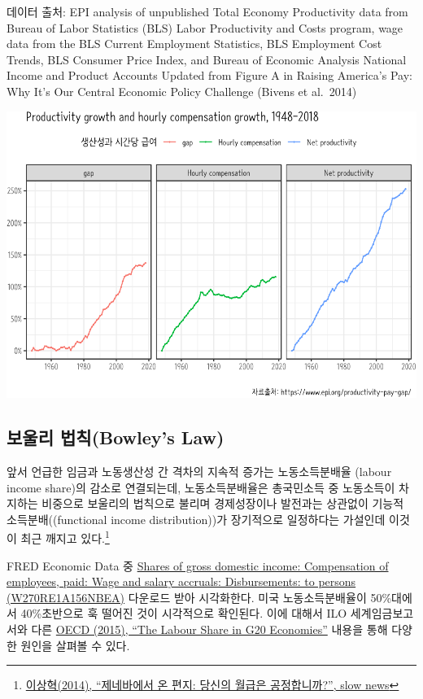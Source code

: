 \documentclass[smallextended]{svjour3}       %
\begin{document}
데이터 출처: EPI analysis of unpublished Total Economy Productivity data
from Bureau of Labor Statistics (BLS) Labor Productivity and Costs
program, wage data from the BLS Current Employment Statistics, BLS
Employment Cost Trends, BLS Consumer Price Index, and Bureau of Economic
Analysis National Income and Product Accounts Updated from Figure A in
Raising America's Pay: Why It's Our Central Economic Policy Challenge
(Bivens et al.~2014)

\begin{center}\includegraphics{paper_files/figure-latex/productivity-gap-1} \end{center}

\hypertarget{bowley-law}{%
\subsection{보울리 법칙(Bowley's Law)}\label{bowley-law}}

앞서 언급한 임금과 노동생산성 간 격차의 지속적 증가는 노동소득분배율
(labour income share)의 감소로 연결되는데, 노동소득분배율은 총국민소득
중 노동소득이 차지하는 비중으로 보울리의 법칙으로 불리며 경제성장이나
발전과는 상관없이 기능적 소득분배((functional income distribution))가
장기적으로 일정하다는 가설인데 이것이 최근 깨지고 있다.\footnote{\href{https://slownews.kr/24431}{이상혁(2014),
  ``제네바에서 온 편지: 당신의 월급은 공정합니까?'', slow news}}

FRED Economic Data 중
\href{https://fred.stlouisfed.org/series/W270RE1A156NBEA}{Shares of
gross domestic income: Compensation of employees, paid: Wage and salary
accruals: Disbursements: to persons (W270RE1A156NBEA)} 다운로드 받아
시각화한다. 미국 노동소득분배율이 50\%대에서 40\%초반으로 훅 떨어진 것이
시각적으로 확인된다. 이에 대해서 ILO 세계임금보고서와 다른
\href{https://www.oecd.org/g20/topics/employment-and-social-policy/The-Labour-Share-in-G20-Economies.pdf}{OECD
(2015), ``The Labour Share in G20 Economies''} 내용을 통해 다양한 원인을
살펴볼 수 있다.
\end{document}
